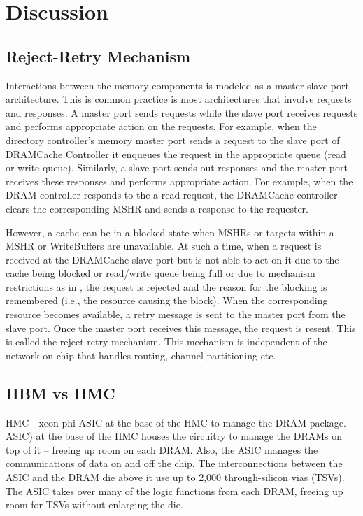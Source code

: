 \section{Discussion}
\subsection{Reject-Retry Mechanism}
Interactions between the memory components is modeled as a master-slave port architecture. This is common practice is most architectures that involve requests and responses. A master port sends requests while the slave port receives requests and performs appropriate action on the requests. For example, when the directory controller's memory master port sends a request to the slave port of DRAMCache Controller it enqueues the request in the appropriate queue (read or write queue). Similarly, a slave port sends out responses and the master port receives these responses and performs appropriate action. For example, when the DRAM controller responds to the a read request, the DRAMCache controller clears the corresponding MSHR and sends a response to the requester.
\par However, a cache can be in a blocked state when MSHRs or targets within a MSHR or WriteBuffers are unavailable. At such a time, when a request is received at the DRAMCache slave port but is not able to act on it due to the cache being blocked or read/write queue being full or due to mechanism restrictions as in \prioname, the request is rejected and the reason for the blocking is remembered (i.e., the resource causing the block). When the corresponding resource becomes available, a retry message is sent to the master port from the slave port. Once the master port receives this message, the request is resent. This is called the reject-retry mechanism. This mechanism is independent of the network-on-chip that handles routing, channel partitioning etc.
\subsection{HBM vs HMC}
HMC - xeon phi 
ASIC at the base of the HMC to manage the DRAM package.
ASIC) at the base of the HMC houses the circuitry to manage the DRAMs on top of it -- freeing up room on each DRAM. Also, the ASIC manages the communications of data on and off the chip. The interconnections between the ASIC and the DRAM die above it use up to 2,000 through-silicon vias (TSVs). The ASIC takes over many of the logic functions from each DRAM, freeing up room for TSVs without enlarging the die.

